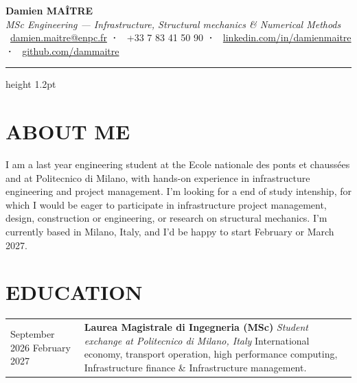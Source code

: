 \documentclass[a4paper,9pt]{extarticle}
\makeatletter
\newcommand{\entry}[4]{%
  \noindent
  \begin{tabularx}{\linewidth}{@{}p{2.6cm}@{\hspace{6pt}}X@{}}
    \small\textcolor{muted}{#1} &
    \textbf{#2} \newline
    \textit{\small\textcolor{muted}{#3}}
    #4
  \end{tabularx}
  \vspace{1pt}
}
\makeatother
\begin{document}
\begin{center}
  {\LARGE\bfseries\color{accent} Damien MAÎTRE}\\[2pt]
  {\normalsize\textit{\textcolor{muted}{MSc Engineering — Infrastructure, Structural mechanics \& Numerical Methods}}}\\[4pt]
  \small
  \textcolor{muted}{
    \faEnvelope\ \href{mailto:damien.maitre@enpc.fr}{damien.maitre@enpc.fr}
    \quad\textbf{·}\quad
    \faPhone\ +33 7 83 41 50 90
    \quad\textbf{·}\quad
    \faLinkedin\ \href{https://linkedin.com/in/damienmaitre}{linkedin.com/in/damienmaitre}
    \quad\textbf{·}\quad
    \faGithub\ \href{https://github.com/dammaitre}{github.com/dammaitre}
  }
\end{center}

\vspace{2pt}
{\color{accent}\hrule height 1.2pt}
\vspace{4pt}

\section{ABOUT ME}

\noindent\small
I am a last year engineering student at the Ecole nationale des ponts et chaussées and at Politecnico di Milano, with hands-on experience in infrastructure engineering and project management. I'm looking for a end of study intenship, for which I would be eager to participate in infrastructure project management, design, construction or engineering, or research on structural mechanics. I'm currently based in Milano, Italy, and I'd be happy to start February or March 2027. \par

\section{EDUCATION}

\entry{September 2026 \newline February 2027}
  {Laurea Magistrale di Ingegneria (MSc)}
  {Student exchange at Politecnico di Milano, Italy}
  {\newline International economy, transport operation, high performance computing, Infrastructure finance \& Infrastructure management.}
\end{document}
